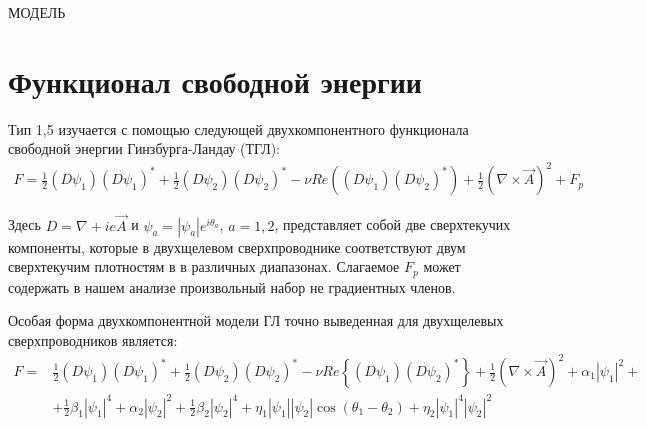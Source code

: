 \begin{center}
    МОДЕЛЬ
\end{center}

\section{Функционал свободной энергии}

Тип 1,5 изучается с помощью следующей двухкомпонентного функционала свободной 
энергии Гинзбурга-Ландау (ТГЛ):
\begin{align}
    F = \frac{1}{2}(D\psi_1)(D\psi_1)^* + \frac{1}{2}(D\psi_2)(D\psi_2)^* - 
        \nu Re\left( (D\psi_1)(D\psi_2)^* \right) + 
        \frac{1}{2}\left(\nabla\times\vec{A}\right)^2 + F_p
    \label{eq:1}
\end{align}

Здесь \( D = \nabla + ie\vec{A} \) и \( \psi_a = |\psi_a|e^{i\theta_a} \), 
\( a = 1,2 \), представляет собой две сверхтекучих компоненты, которые в 
двухщелевом сверхпроводнике соответствуют двум сверхтекучим плотностям в 
в различных диапазонах. Слагаемое \( F_p \) может содержать в нашем 
анализе произвольный набор не градиентных членов.

Особая форма двухкомпонентной модели ГЛ точно выведенная 
\cite{bib:8,bib:9,bib:10} для двухщелевых сверхпроводников является:
\begin{align}
    F = & \frac{1}{2}(D\psi_1)(D\psi_1)^* + \frac{1}{2}(D\psi_2)(D\psi_2)^* - 
        \nu Re\left\{ (D\psi_1)(D\psi_2)^* \right\} + 
        \frac{1}{2}\left(\nabla\times\vec{A}\right)^2 + \alpha_1|\psi_1|^2 + 
        \nonumber \\
        & + \frac{1}{2}\beta_1|\psi_1|^4 + \alpha_2|\psi_2|^2 + 
        \frac{1}{2}\beta_2|\psi_2|^4 + \eta_1|\psi_1||\psi_2|
        \cos(\theta_1-\theta_2) + \eta_2|\psi_1|^4|\psi_2|^2
    \label{eq:2}
\end{align}

